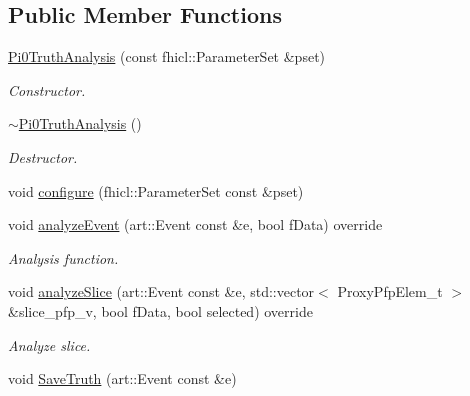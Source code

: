 \subsection*{Public Member Functions}
\begin{DoxyCompactItemize}
\item 
\hyperlink{classanalysis_1_1Pi0TruthAnalysis_ad58bc9cafaa153ef9c775b505d00f5ef}{Pi0\-Truth\-Analysis} (const fhicl\-::\-Parameter\-Set \&pset)
\begin{DoxyCompactList}\small\item\em Constructor. \end{DoxyCompactList}\item 
\hypertarget{classanalysis_1_1Pi0TruthAnalysis_aacb1da6bc05c5af7d13e6699c1b9112d}{\hyperlink{classanalysis_1_1Pi0TruthAnalysis_aacb1da6bc05c5af7d13e6699c1b9112d}{$\sim$\-Pi0\-Truth\-Analysis} ()}\label{classanalysis_1_1Pi0TruthAnalysis_aacb1da6bc05c5af7d13e6699c1b9112d}

\begin{DoxyCompactList}\small\item\em Destructor. \end{DoxyCompactList}\item 
void \hyperlink{classanalysis_1_1Pi0TruthAnalysis_abbbb2436e35ba1e3bc64c4fd4e07668c}{configure} (fhicl\-::\-Parameter\-Set const \&pset)
\item 
void \hyperlink{classanalysis_1_1Pi0TruthAnalysis_a07cf437c5f9d2b19b7a0ca3de447d12f}{analyze\-Event} (art\-::\-Event const \&e, bool f\-Data) override
\begin{DoxyCompactList}\small\item\em Analysis function. \end{DoxyCompactList}\item 
\hypertarget{classanalysis_1_1Pi0TruthAnalysis_a02b3f2e32b0e8097c0432bd013c0dbe1}{void \hyperlink{classanalysis_1_1Pi0TruthAnalysis_a02b3f2e32b0e8097c0432bd013c0dbe1}{analyze\-Slice} (art\-::\-Event const \&e, std\-::vector$<$ Proxy\-Pfp\-Elem\-\_\-t $>$ \&slice\-\_\-pfp\-\_\-v, bool f\-Data, bool selected) override}\label{classanalysis_1_1Pi0TruthAnalysis_a02b3f2e32b0e8097c0432bd013c0dbe1}

\begin{DoxyCompactList}\small\item\em Analyze slice. \end{DoxyCompactList}\item 
\hypertarget{classanalysis_1_1Pi0TruthAnalysis_adf40bf270a043c1eb7837460bf0e2fc5}{void \hyperlink{classanalysis_1_1Pi0TruthAnalysis_adf40bf270a043c1eb7837460bf0e2fc5}{Save\-Truth} (art\-::\-Event const \&e)}\label{classanalysis_1_1Pi0TruthAnalysis_adf40bf270a043c1eb7837460bf0e2fc5}


\end{DoxyCompactItemize}
